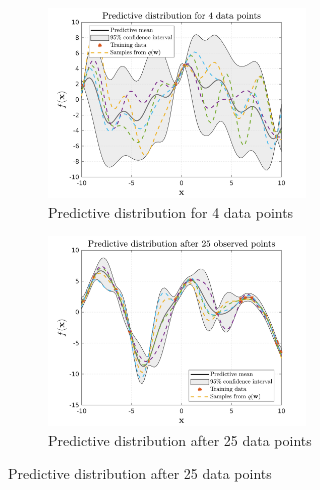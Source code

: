 \begin{figure}[htbp]    
  \begin{subfigure}[b]{0.95\linewidth}
    \centering
    \includegraphics[trim={0 0.18cm 0 0.70cm},clip,height=0.27\textheight,width=0.75\textwidth]{Chapter3/Figures/func_uncertainty_1.png} 
    \caption{Predictive distribution for 4 data points} 
    \label{Fig:Re-pred-4-points} 
  \end{subfigure}

  \begin{subfigure}[b]{0.95\linewidth}
    \centering
    \includegraphics[trim={0 0.18cm 0 0.70cm},clip,height=0.27\textheight,width=0.75\textwidth]{Chapter3/Figures/func_uncertainty_2.png} 
    \caption{Predictive distribution after 25 data points} 
    \label{Fig:Re-pred-25-points}
  \end{subfigure}
  

\end{figure}
